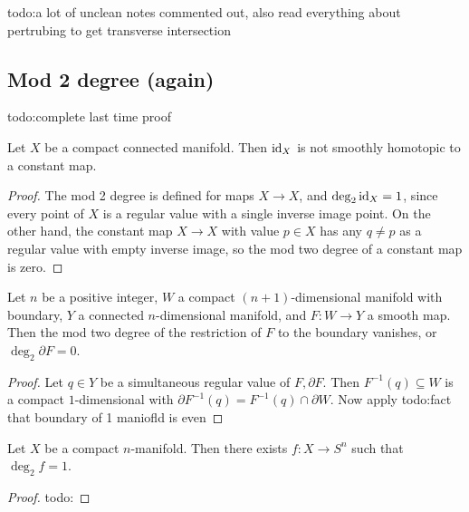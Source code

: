 {\color{red}todo:a lot of unclean notes commented out, also read everything about pertrubing to get transverse intersection} 
\subsection{Mod 2 degree (again)}
{\color{red}todo:complete last time proof} 
\begin{prop}
    Let $X$ be a compact connected manifold. Then $\operatorname{id}_X$ is not smoothly homotopic to a constant map.
\end{prop}
\begin{proof}
    The mod 2 degree is defined for maps $X\to X$, and $\deg_2\operatorname{id}_X=1$, since every point of $X$ is a regular value with a single inverse image point. On the other hand, the constant map $X\to X$ with value $p \in X$ has any $q\neq p$ as a regular value with empty inverse image, so the mod two degree of a constant map is zero.
\end{proof}
\begin{prop}
    Let $n$ be a positive integer, $W$ a compact $(n+1)$-dimensional manifold with boundary, $Y$ a connected $n$-dimensional manifold, and $F \colon W \to Y$ a smooth map. Then the mod two degree of the restriction of $F$ to the boundary vanishes, or $\deg_2 \partial F=0$.
\end{prop}
\begin{proof}
    Let $q \in Y$ be a simultaneous regular value of $F, \partial F$. Then $F^{-1}(q)  \subseteq W$ is a compact $1$-dimensional with $\partial F^{-1}(q)=F^{-1}(q)\cap \partial W$. Now apply {\color{red}todo:fact that boundary of 1 maniofld is even} 
\end{proof}
\begin{prop}
    Let $X$ be a compact $n$-manifold. Then there exists $f \colon X \to S^n $ such that $\deg_2f=1$.
\end{prop}
\begin{proof}
    {\color{red}todo:} 
\end{proof}
